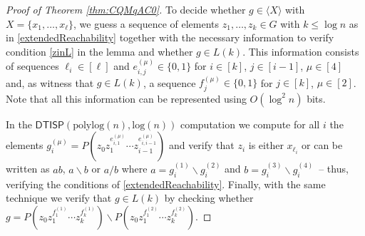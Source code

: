 \documentclass{article}
\newcommand*{\ComplexityClass}[1]{\ensuremath{\mathsf{#1}}\xspace}
\newcommand{\DTISP}{\ComplexityClass{DTISP}}
\newcommand{\DTISPpll}{\ensuremath{\DTISP(\mathrm{polylog}(n),\mathrm{log}(n))}\xspace}
\begin{document}
\begin{proof}[Proof of Theorem \ref{thm:CQMqAC0}]
    To decide whether $g \in \langle X \rangle$ with $X = \{x_1, \dots, x_\ell\}$, we guess a sequence of elements $z_1, \dots, z_k \in G$ with $k \leq \log n$ as in \cref{extendedReachability} together with the necessary information to verify condition \ref{zinL} in the lemma and whether $g \in L(k)$. This information consists of sequences $\ell_i \in [\ell]$ and $e_{i,j}^{(\mu)}\in \{0,1\}$ for $i \in [k]$, $j\in [i-1]$, $\mu \in [4]$ and, as witness that $g \in L(k)$, a sequence $f_j^{(\mu)}\in \{0,1\}$ for $j\in [k]$, $\mu \in [2]$. Note that all this information can be represented using $O(\log^2n)$ bits. 


    In the \DTISPpll computation we compute for all $i$ the elements $g_i^{(\mu)} = P(z_0z_{1}^{e_{i,1}^{(\mu)}} \cdots z_{i-1}^{e_{i,i-1}^{(\mu)}})$ and verify that $z_i $ is either $x_{\ell_i}$ or can be written as $ab$, $a\backslash b$ or $a/b$ where $a = g_i^{(1)} \backslash g_i^{(2)}$ and $b = g_i^{(3)} \backslash g_i^{(4)}$~-- thus, verifying the conditions of \cref{extendedReachability}. Finally, with the same technique we verify that $g\in L(k)$ by checking whether $g = P(z_0z_{1}^{f_{1}^{(1)}} \cdots z_{k}^{f_{k}^{(1)}})  \backslash P(z_0z_{1}^{f_{1}^{(2)}} \cdots z_{k}^{f_{k}^{(2)}}) $.
\end{proof}
\end{document}
